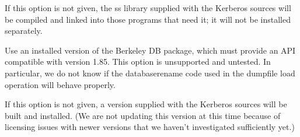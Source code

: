 \documentclass[letterpaper,10pt,english]{sphinxmanual}
\begin{document}
\begin{description}
\sphinxAtStartPar
If this option is not given, the ss library supplied with the
Kerberos sources will be compiled and linked into those programs
that need it; it will not be installed separately.

\sphinxAtStartPar
Use an installed version of the Berkeley DB package, which must
provide an API compatible with version 1.85.  This option is
unsupported and untested.  In particular, we do not know if the
database\sphinxhyphen{}rename code used in the dumpfile load operation will
behave properly.

\sphinxAtStartPar
If this option is not given, a version supplied with the Kerberos
sources will be built and installed.  (We are not updating this
version at this time because of licensing issues with newer
versions that we haven’t investigated sufficiently yet.)

\end{description}
\end{document}
